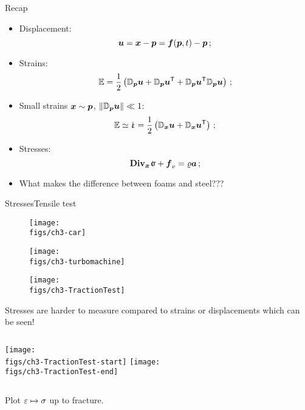 \begin{frame}{Recap}{}

\begin{itemize}
\item Displacement:
\begin{displaymath}
{\boldsymbol{u}}={\boldsymbol{x}}-{\boldsymbol{p}}={\boldsymbol{f}}({\boldsymbol{p}},t)-{\boldsymbol{p}}\,;
\end{displaymath}
\item Strains:
\begin{displaymath}
{\mathbb{E}}=\frac{1}{2}\left({\mathbb D}_{\boldsymbol{p}}{\boldsymbol{u}}+{\mathbb D}_{\boldsymbol{p}}{\boldsymbol{u}}^{\sf T}+{\mathbb D}_{\boldsymbol{p}}{\boldsymbol{u}}^{\sf T}{\mathbb D}_{\boldsymbol{p}}{\boldsymbol{u}}\right)\,;
\end{displaymath}
\item Small strains ${\boldsymbol{x}}\sim{\boldsymbol{p}}$, $\left\|{\mathbb D}_{\boldsymbol{p}}{\boldsymbol{u}}\right\|\ll 1$:
\begin{displaymath}
\GreenL\simeq\strain=\demi\left(\Gradx\uv+\Gradx\uv^\itr\right)\,;
\end{displaymath}
\item Stresses:
\begin{displaymath}
\Divx\stress+\fv_v=\roi\av\,;
\end{displaymath}
\item What makes the difference between foams and steel???
\end{itemize}

\end{frame}

\begin{frame}{Stresses}{Tensile test}

\begin{overprint}

\vskip-10pt
\begin{figure}
\centering\texttt{[image: \\figs/ch3-car]}
\end{figure}
\begin{figure}
\centering\texttt{[image: \\figs/ch3-turbomachine]}
\end{figure}

\begin{figure}
\centering\texttt{[image: \\figs/ch3-TractionTest]}
\end{figure}
Stresses are harder to measure compared to strains or displacements which can be seen!

\begin{columns}[t]
\centering\texttt{[image: \\figs/ch3-TractionTest-start]}
\centering\texttt{[image: \\figs/ch3-TractionTest-end]}
\end{columns}
\centering Plot $\varepsilon\mapsto\sigma$ up to fracture.

\end{overprint}

\end{frame}

